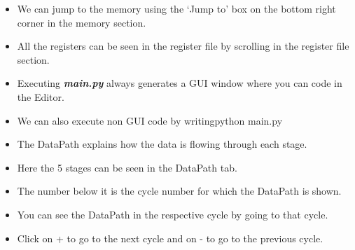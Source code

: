 \documentclass{article}
\begin{document}
\begin{itemize}
    \item We can jump to the memory using the `Jump to' box on the bottom right corner in the memory section.
    \item All the registers can be seen in the register file by scrolling in the register file section.
    \item Executing \textsl{\textbf{main.py}} always generates a GUI window where you can code in the Editor.
    \item We can also execute non GUI code by writing\textrightarrow   python main.py
    \item The DataPath explains how the data is flowing through each stage.
    \item Here the 5 stages can be seen in the DataPath tab.
    \item The number below it is the cycle number for which the DataPath is shown.
    \item You can see the DataPath in the respective cycle by going to that cycle.
    \item Click on + to go to the next cycle and on - to go to the previous cycle.
\end{itemize}
\end{document}

